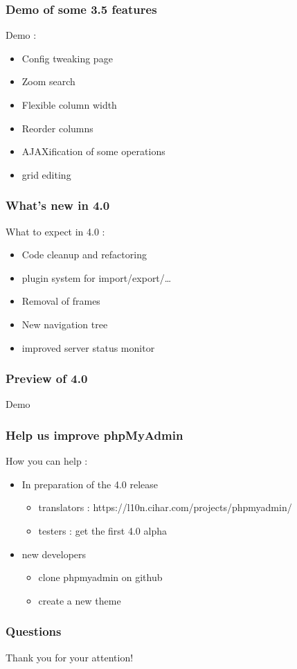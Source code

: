 \documentclass{beamer}
\begin{document}
  \begin{frame}
    \frametitle{Demo of some 3.5 features}
    Demo :
    \begin{itemize}
      \item Config tweaking page
      \item Zoom search
      \item Flexible column width
      \item Reorder columns
      \item AJAXification of some operations
      \item grid editing
    \end{itemize}
  \end{frame}
  \begin{frame}
    \frametitle{What's new in 4.0}
    What to expect in 4.0 :
    \pause
    \begin{itemize}[<+->]
      \item Code cleanup and refactoring
      \item plugin system for import/export/\ldots
      \item Removal of frames
      \item New navigation tree
      \item improved server status monitor
    \end{itemize}
  \end{frame}
  \begin{frame}
     \frametitle{Preview of 4.0}
     Demo
  \end{frame}
  \begin{frame}
  \frametitle{Help us improve phpMyAdmin}
    How you can help :
    \pause
    \begin{itemize}[<+->]
      \item In preparation of the 4.0 release
        \begin{itemize}[<+->]
          \item translators : https://l10n.cihar.com/projects/phpmyadmin/
          \item testers : get the first 4.0 alpha
	\end{itemize}
      \item new developers
	\begin{itemize}[<+->]
          \item clone phpmyadmin on github
          \item create a new theme
	\end{itemize}

    \end{itemize}
  \end{frame}
  \begin{frame}
  \frametitle{Questions}
    Thank you for your attention!
  \end{frame}
\end{document}
